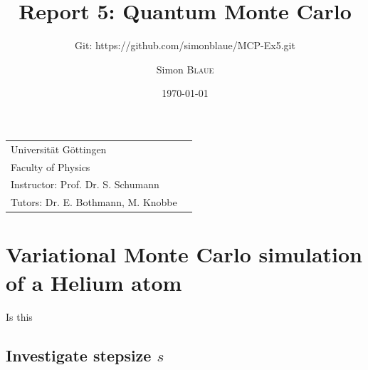 \documentclass[
	a4paper, %
	10pt, %
]{CSUniSchoolLabReport}
\title{Report 5: Quantum Monte Carlo} %
\subtitle{Git: https://github.com/simonblaue/MCP-Ex5.git}
\author{Simon \textsc{Blaue}} %
\date{\today} %
\begin{document}
\maketitle %

\vspace*{40px}

\begin{tabular}{l r}
	Universität Göttingen \\ %
	Faculty of Physics \\
	Instructor: Prof. Dr. S. Schumann \\
	Tutors: Dr. E. Bothmann, M. Knobbe \\ %
\end{tabular}



\newpage

\ohead{\pagemark}

\section{Variational Monte Carlo simulation of a Helium atom}

Is this

\subsection{Investigate stepsize $s$}
\end{document}
